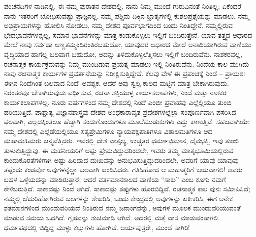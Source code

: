 ಪಂಚನದಿಗಳ ನಾಡಿನಲ್ಲಿ, ಈ ನಮ್ಮ ಪುರಾತನ ದೇಶದಲ್ಲಿ, ನಾನು ನಿಮ್ಮ ಮುಂದೆ ಗುರುವಿನಂತೆ ನಿಂತಿಲ್ಲ; ಏಕೆಂದರೆ ನಾನು ಇತರರಿಗೆ ಬೋಧಿಸುವಷ್ಟು ಪ್ರಾಜ್ಞನಲ್ಲ. ನಮ್ಮ ಪಶ್ಚಿಮ ದಿಕ್ಕಿನ ಭ್ರಾತೃಗಳಲ್ಲಿ ಕುಶಲಪ್ರಶ್ನೆಯನ್ನು ಮಾಡಲು, ನಮ್ಮ ಅಭಿಪ್ರಾಯಗಳನ್ನು ಹೋಲಿಸಿ ನೋಡಲು, ನಮ್ಮ ದೇಶದ ಪೂರ್ವಭಾಗದಿಂದ ಬಂದು ನಿಂತಿದ್ದೇನೆ. ನಮ್ಮಲ್ಲಿರುವ ಭೇದಭಾವನೆಗಳನ್ನಲ್ಲ, ಸಮಾನ ಭಾವನೆಗಳನ್ನು ಮಾತ್ರ ಕಂಡುಕೊಳ್ಳಲು ಇಲ್ಲಿಗೆ ಬಂದಿರುತ್ತೇನೆ. ಯಾವ ತತ್ತ್ವದ ಆಧಾರದ ಮೇಲೆ ನಾವು ಸರ್ವದಾ ಅಣ್ಣತಮ್ಮಂದಿರಂತಿರಬಹುದೋ, ಯಾವುದರ ಆಧಾರದ ಮೇಲೆ ಅನಾದಿಯಾಗಿರುವ ವಾಣಿಯು ವೃದ್ಧಿಯಾದ ಹಾಗೆಲ್ಲ ಬಲವಾಗ ಬಹುದೋ, ಅದನ್ನು ತಿಳಿದುಕೊಳ್ಳಲೆತ್ನಿಸಲು ಇಲ್ಲಿಗೆ ಬಂದಿರುವೆನು. ನಾಶಕರವಲ್ಲ, ರಚನಾತ್ಮಕ ಕಾರ್ಯಕ್ರಮವನ್ನು ನಿಮ್ಮ ಮುಂದಿಡುವ ಪ್ರಯತ್ನ ಮಾಡಲು ಇಲ್ಲಿ ನಿಂತಿರುವೆನು. ನಿಂದೆಯ ಕಾಲ ಮುಗಿದು ನಾವು ರಚನಾತ್ಮಕ ಕಾರ್ಯಗಳ ಪ್ರವರ್ತನೆಯನ್ನು ನಿರೀಕ್ಷಿಸುತ್ತಿದ್ದೇವೆ. ಕೆಲವು ವೇಳೆ ಈ ಪ್ರಪಂಚಕ್ಕೆ ನಿಂದೆ – ಪ್ರಾಯಶಃ ಈಗಿನ ನಿಂದೆಗಿಂತ ಬಲವಾದ ನಿಂದೆ–ಅವಶ್ಯಕ. ಆದರೆ ಅವು ಸ್ವಲ್ಪ ಕಾಲದ ಮಟ್ಟಿಗೆ ಮಾತ್ರ ಬೇಕಾಗಿರುವುದು. ನಿರಂತರವೂ ಬೇಕಾಗಿರುವುದು ವರ್ಧಿಸುವ, ರಚನಾ ಶಕ್ತಿಯುಳ್ಳ ಕಾರ್ಯಕಲಾಪಗಳು, ನಿಂದೆ ಮತ್ತು ನಾಶಕರ ಕಾರ್ಯಕಲಾಪಗಳಲ್ಲ. ನೂರು ವರ್ಷಗಳಿಂದ ನಮ್ಮ ದೇಶದಲ್ಲಿ ನಿಂದೆ ಎಂಬೀ ಪ್ರವಾಹವು ಎಲ್ಲೆಲ್ಲಿಯೂ ತುಂಬಿ ಹರಿಯುತ್ತಿದೆ. ಪಾಶ್ಚಾತ್ಯ ವಿಜ್ಞಾನಶಾಸ್ತ್ರವು ದೇಶದ ಅಂಧಕಾರಾವೃತ ಪ್ರದೇಶಗಳಲ್ಲೆಲ್ಲಾ ಸಂಪೂರ್ಣವಾಗಿ ಪಸರಿಸಿದ ಫಲವಾಗಿ, ಎಲ್ಲದಕ್ಕಿಂತಲೂ ಹೆಚ್ಚಾಗಿ ಸಂದುಗೊಂದುಗಳೂ ಮೂಲೆಮುಡುಕುಗಳು ಎದ್ದು ಕಾಣುತ್ತಿವೆ. ಸಹಜವಾಗಿಯೇ ನಮ್ಮ ದೇಶದಲ್ಲಿ ಎಲ್ಲೆಡೆಯಲ್ಲಿಯೂ ಸತ್ಯಪ್ರೇಮಿಗಳೂ ನ್ಯಾಯಪಕ್ಷಪಾತಿಗಳೂ ವಿಶಾಲಮತಿಗಳೂ ಆದ ಮಹಾಮಹಿಮರು ಜನ್ಮವೆತ್ತಿದರು. ಇವರಲ್ಲಿ ದೇಶ ವಾತ್ಸಲ್ಯ, ಉಚ್ಚತರ ಧರ್ಮಾಭಿಮಾನ, ದೈವಭಕ್ತಿ, ಇವು ತುಂಬಿ ತುಳುಕುತ್ತಿದ್ದುವು. ಈ ಮಹನೀಯರಿಗೆ ಅಷ್ಟು ಪ್ರೇಮವಿದ್ದುದರಿಂದಲೇ, ಇವರು ತಮ್ಮ ಮಾತೃಭೂಮಿಯಲ್ಲಿರುವ ಕುಂದುಕೊರತೆಗಳಿಗಾಗಿ ಅಷ್ಟು ಹಿರಿದಾದ ದುಃಖವನ್ನು ಅನುಭವಿಸುತ್ತಿದ್ದುದರಿಂದಲೇ, ಅವರಿಗೆ ಯಾವು ಯಾವುವು ತಪ್ಪೆಂದು ಕಂಡವೋ ಅವುಗಳನ್ನೆಲ್ಲಾ ಬಲವಾಗಿ ಖಂಡಿಸಿದರು. ಗತಿಸಿಹೋದ ಆ ಮಹಾತ್ಮರಿಗೆ ಜಯವಾಗಲಿ! ಅವರು ಬಹಳ ಒಳ್ಳೆಯದನ್ನು ಮಾಡಿರುತ್ತಾರೆ; ಆದರೆ ವರ್ತಮಾನಕಾಲದ ವಾಣಿಯ “ಸಾಕು” ಎಂಬ ಕೂಗು ನಮಗೆ ಕೇಳಿಬರುತ್ತಿದೆ. ಸಾಕಾದಷ್ಟು ನಿಂದೆ ಆಗಿದೆ. ಸಾಕಾದಷ್ಟು ತಪ್ಪುಗಳು ಹೊರಬಿದ್ದಿವೆ. ರಚನಾತ್ಮಕ ಕಾಲ ಪುನಃ ಸಮೀಪಿಸಿದೆ; ನಮ್ಮಲ್ಲಿ ಚೆದುರಿಹೋಗಿರುವ ಬಲಗಳನ್ನು ಶೇಖರಿಸಿ, ಒಂದು ಕೇಂದ್ರದಲ್ಲಿ ಅವುಗಳನ್ನು ಏಕೀಕರಿಸಿ, ಈಗ ಅನೇಕ ಶತಮಾನಗಳಿಂದ ಮುಂದುವರಿಯದೆ ನಿಂತಿರುವ ನಮ್ಮ ಜನಾಂಗವನ್ನು, ಅವುಗಳ ಮೂಲಕ ಮುಂದುವರಿಯುವಂತೆ ಮಾಡುವ ಸಮಯ ಒದಗಿದೆ. ಗೃಹವನ್ನು ಶುಚಿಮಾಡಿ ಆಗಿದೆ. ಅದರಲ್ಲಿ ಮತ್ತೆ ವಾಸ ಮಾಡುವಂತಾಗಲಿ. ಧರ್ಮಪಥದಲ್ಲಿ ಬಿದ್ದಿದ್ದ ಮುಳ್ಳು ಕಲ್ಲುಗಳು ಹೋಗಿವೆ. ಆರ್ಯಪುತ್ರರೇ, ಮುಂದೆ ಸಾಗಿರಿ!

